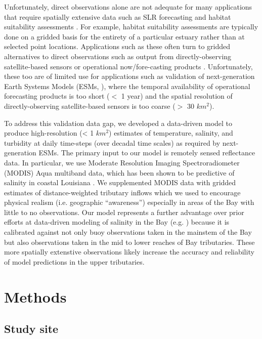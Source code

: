 \documentclass{article}
\begin{document}
Unfortunately, direct observations alone are not adequate for many applications that require spatially extensive data such as SLR forecasting and habitat suitability assessments \citep{hoodChesapeakeBayProgram2021}. For example, habitat suitability assessments are typically done on a gridded basis for the entirety of a particular estuary rather than at selected point locations. Applications such as these often turn to gridded alternatives to direct observations such as output from directly-observing satellite-based sensors \citep{foreCombinedActivePassive2016} or operational now/fore-casting products \citep{lanerolle2011second}. Unfortunately, these too are of limited use for applications such as validation of next-generation Earth Systems Models (ESMs, \citet{golazDOEE3SMModel2022}), where the temporal availability of operational forecasting products is too short ($<$ 1 year) and the spatial resolution of directly-observing satellite-based sensors is too coarse ($>$ 30 $km^2$).

To address this validation data gap, we developed a data-driven model to produce high-resolution (< 1 $km^2$) estimates of temperature, salinity, and turbidity at daily time-steps (over decadal time scales) as required by next-generation ESMs. The primary input to our model is remotely sensed reflectance data. In particular, we use Moderate Resolution Imaging Spectroradiometer (MODIS) Aqua multiband data, which has been shown to be predictive of salinity in coastal Louisiana \citep{vogelAssessingSatelliteSea2016, wangDevelopmentMODISData2018}. We supplemented MODIS data with gridded estimates of distance-weighted tributary inflows which we used to encourage physical realism (i.e. geographic “awareness”) especially in areas of the Bay with little to no observations. Our model represents a further advantage over prior efforts at data-driven modeling of salinity in the Bay (e.g. \citet{vogelAssessingSatelliteSea2016, murphyComparisonSpatialInterpolation2010}) because it is calibrated against not only buoy observations taken in the mainstem of the Bay but also observations taken in the mid to lower reaches of Bay tributaries. These more spatially extenstive observations likely increase the accuracy and reliability of model predictions in the upper tributaries.


\section{Methods}

\subsection{Study site}
\end{document}
